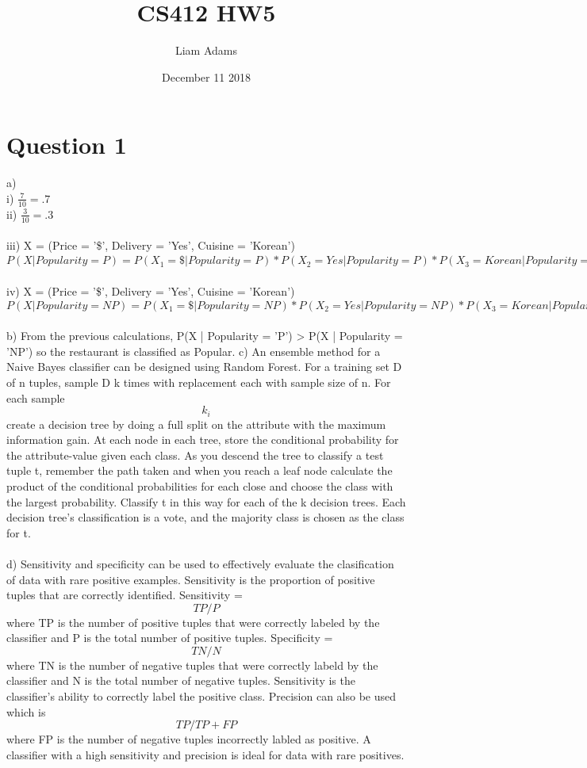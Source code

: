 \documentclass{article}
\title{CS412 HW5}
\author{Liam Adams }
\date{December 11 2018}
\begin{document}
\maketitle

\section{Question 1}
a)\\
  i) $\frac{7}{10} = .7$\\
  ii) $\frac{3}{10} = .3$\\\\
  iii) X = (Price = '\$', Delivery = 'Yes', Cuisine = 'Korean')\\
       $P(X | Popularity = P) = P(X_1 = \$ | Popularity = P) * P(X_2 = Yes | Popularity = P) * P(X_3 = Korean | Popularity = P) = 
       \frac{3}{7} * \frac{5}{7} * \frac{2}{7} = .0875$\\\\
  iv) X = (Price = '\$', Delivery = 'Yes', Cuisine = 'Korean')\\
  $P(X | Popularity = NP) = P(X_1 = \$ | Popularity = NP) * P(X_2 = Yes | Popularity = NP) * P(X_3 = Korean | Popularity = NP) = 
  \frac{1}{3} * \frac{1}{3} * \frac{1}{3} = .037$\\\\
b) From the previous calculations, P(X | Popularity = 'P') > P(X | Popularity = 'NP') so the restaurant is classified as Popular.
c) An ensemble method for a Naive Bayes classifier can be designed using Random Forest.  For a training set D of n tuples, sample D k times with replacement 
each with sample size of n.  For each sample $$k_i$$ create a decision tree by doing a full split on the attribute with the maximum information gain.
At each node in each tree, store the conditional probability for the attribute-value given each class.  As you descend the tree to classify a test tuple t, remember the path taken
and when you reach a leaf node calculate the product of the conditional probabilities for each close and choose the class with the largest probability.
Classify t in this way for each of the k decision trees.  Each decision tree's classification is a vote, and the majority class is chosen as the class for t.\\\\
d) Sensitivity and specificity can be used to effectively evaluate the clasification of data with rare positive examples.  Sensitivity is the proportion
of positive tuples that are correctly identified.  Sensitivity = $$TP/P$$ where TP is the number of positive tuples that were correctly labeled by the classifier
 and P is the total number of positive tuples.  Specificity = $$TN/N$$ where TN is the number of negative tuples that were correctly labeld by the classifier
  and N is the total number of negative tuples. Sensitivity is the classifier's ability to correctly label the positive class.
Precision can also be used which is $$TP/TP + FP$$ where FP is the number of negative tuples incorrectly labled as positive.  A classifier with a high
sensitivity and precision is ideal for data with rare positives.\\\\
\end{document}
